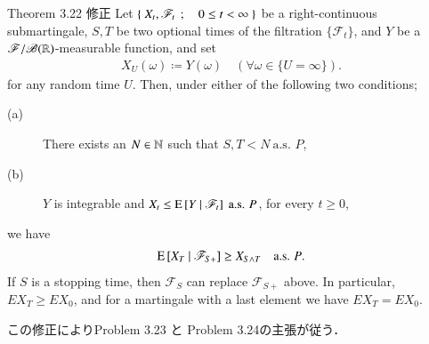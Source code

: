 	\begin{itembox}[l]{Theorem 3.22 修正}
		Let $\left\{\ X_t,\mathscr{F}_t\ \, ; \quad 0 \leq t < \infty\ \right\}$ be a right-continuous submartingale,
		$S, T$ be two optional times of the filtration $\{\mathscr{F}_t\}$,
		and $Y$ be a $\mathscr{F}/\mathscr{B}(\mathbb{R})$-measurable function, and set
		\begin{align}
			X_U(\omega) \coloneqq Y(\omega)
			\quad (\forall \omega \in \{U = \infty\}).
		\end{align}
		for any random time $U$. Then, under either of the following two conditions;
		\begin{description}
			\item[(a)] There exists an $N \in \mathbb{N}$ such that $S,T < N\ \mbox{a.s. $P$}$,
			\item[(b)] $Y$ is integrable and $X_t \leq \operatorname{E} \left[ Y \ \middle|\ \mathscr{F}_t \right]\ \mbox{a.s. $P$}$, for every $t \geq 0$,
		\end{description}
		we have
		\begin{align}
			\operatorname{E} \left[ X_T \ \middle|\ \mathscr{F}_{S+} \right] \geq X_{S \wedge T}
			\quad \mbox{a.s. $P$}.
		\end{align}
		If $S$ is a stopping time, then $\mathscr{F}_S$ can replace $\mathscr{F}_{S+}$ above.
		In particular, $EX_T \geq EX_0$, and for a martingale with a last element we have $EX_T = EX_0$.
	\end{itembox}
	この修正によりProblem 3.23 と Problem 3.24の主張が従う．
